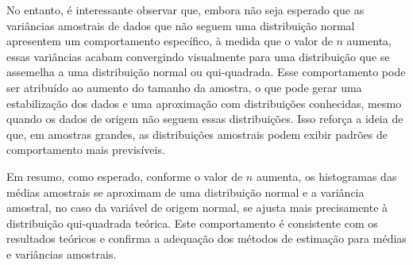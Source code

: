 \documentclass[a4paper, 11pt]{article}
\begin{document}
No entanto, é interessante observar que, embora não seja esperado que as variâncias amostrais de dados que não seguem uma distribuição normal apresentem um comportamento específico, à medida que o valor de \(n\) aumenta, essas variâncias acabam convergindo visualmente para uma distribuição que se assemelha a uma distribuição normal ou qui-quadrada. Esse comportamento pode ser atribuído ao aumento do tamanho da amostra, o que pode gerar uma estabilização dos dados e uma aproximação com distribuições conhecidas, mesmo quando os dados de origem não seguem essas distribuições. Isso reforça a ideia de que, em amostras grandes, as distribuições amostrais podem exibir padrões de comportamento mais previsíveis. 

Em resumo, como esperado, conforme o valor de \(n\) aumenta, os histogramas das médias amostrais se aproximam de uma distribuição normal e a variância amostral, no caso da variável de origem normal, se ajusta mais precisamente à distribuição qui-quadrada teórica. Este comportamento é consistente com os resultados teóricos e confirma a adequação dos métodos de estimação para médias e variâncias amostrais.

\newpage

 
\end{document}
